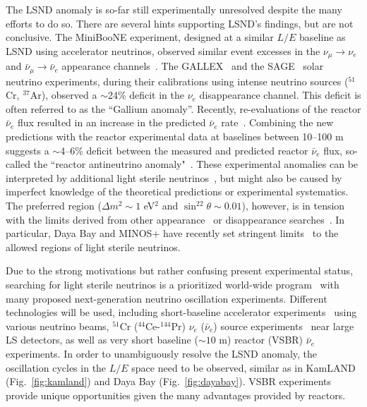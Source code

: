 The LSND anomaly is so-far still experimentally unresolved despite the many efforts to do so. 
There are several hints supporting LSND's findings, but are not conclusive.
The MiniBooNE experiment, designed at a similar $L/E$ baseline as LSND using accelerator neutrinos, observed similar event excesses in the $\nu_{\mu}\rightarrow\nu_e$ and $\bar\nu_{\mu}\rightarrow\bar\nu_e$ appearance channels~\cite{MiniBooNE2007,MiniBooNE2013}. 
The GALLEX~\cite{GALLEX2010} and the SAGE~\cite{SAGE2009} solar neutrino experiments, during their calibrations using intense neutrino sources ($^{51}$Cr, $^{37}$Ar), observed a $\sim$24\% deficit in the $\nu_e$ disappearance channel. 
This deficit is often referred to as the ``Gallium anomaly''. 
Recently, re-evaluations of the reactor $\bar\nu_e$ flux resulted in an increase in the predicted $\bar\nu_e$ rate~\cite{Mueller, Huber}. 
Combining the new predictions with the reactor experimental data at baselines between 10--100 m~\cite{ILL,Gosgen,Rovno,Krasnoyarsk,SRP,Bugey4,Bugey3} suggests a $\sim$4--6\% deficit between the measured and predicted reactor $\bar\nu_e$ flux, so-called the ``reactor antineutrino anomaly"~\cite{Mention,Zhang13}. 
These experimental anomalies can be interpreted by additional light sterile neutrinos~\cite{Guinti2011}, but might also be caused by imperfect knowledge of the theoretical predictions or experimental systematics.  
The preferred region ($\Delta{m}^2\sim1$ eV$^2$ and $\sin^22\theta\sim0.01$), however, is in tension with the limits derived from other appearance~\cite{KARMEN2002,NOMAD03,OPERA13,ICARUS13} or disappearance searches~\cite{Stockdale84,Dydak84,MiniBooNE12-nubar,MiniBooNE12-nu,SuperK2000,MINOS11-NC,Bugey3,Conrad12}. In particular, Daya Bay and MINOS+ have recently set stringent limits~\cite{DayaBaySterile,Sousa-Neutrino14} to the allowed regions of light sterile neutrinos.

Due to the strong motivations but rather confusing present experimental status, searching for light sterile neutrinos is a prioritized world-wide program~\cite{sterileWP} with many proposed next-generation neutrino oscillation experiments.
Different technologies will be used, including short-baseline accelerator experiments~\cite{IsoDAR,OscSNS,NESSiE,LAr1-ND,nuSTORM} using various neutrino beams, $^{51}$Cr ($^{44}$Ce-$^{144}$Pr) $\nu_e$ ($\bar\nu_e$) source experiments~\cite{Cribier2011,Dwyer2013,SOX,CeLAND} near large LS detectors, as well as very short baseline ($\sim10$ m) reactor (VSBR) $\bar\nu_e$ experiments. 
In order to unambiguously resolve the LSND anomaly, the oscillation cycles in the $L/E$ space need to be observed, similar as in KamLAND (Fig.~\ref{fig:kamland}) and Daya Bay (Fig.~\ref{fig:dayabay}). VSBR experiments provide unique opportunities given the many advantages provided by reactors.


